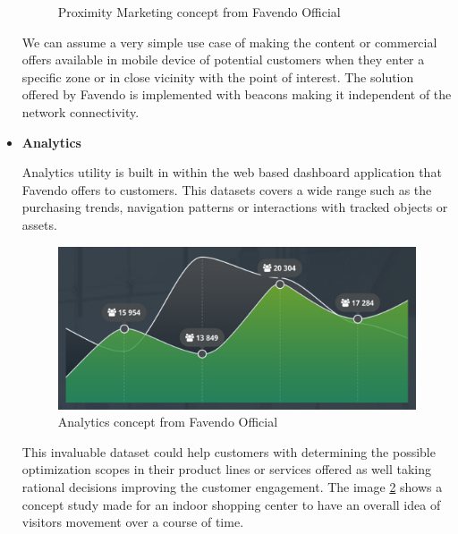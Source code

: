 \begin{itemize}
\begin{figure}[H]
	 	\caption{Proximity Marketing concept from Favendo Official \cite{favendoataglance}}
	 	\label{figure:proximitymarketing_concept}
	 \end{figure}
 	\par We can assume a very simple use case of making the content or commercial offers available in mobile device of potential customers when they enter a specific zone or in close vicinity with the point of interest. The solution offered by Favendo is implemented with beacons making it independent of the network connectivity.
 	\item \textbf{Analytics}
 	\par Analytics utility is built in within the web based dashboard application that Favendo offers to customers. This datasets covers a wide range such as the purchasing trends, navigation patterns or interactions with tracked objects or assets.
 	\begin{figure}[H]
 		\centering
 		\includegraphics[scale = 0.5]{images/analytics}
 		\caption{Analytics concept from Favendo Official \cite{favendoataglance}}
 		\label{figure:analytics_concept}
 	\end{figure}
 	\par This invaluable dataset could help customers with determining the possible optimization scopes in their product lines or services offered as well taking rational decisions improving the customer engagement. The image \ref{figure:analytics_concept} shows a concept study made for an indoor shopping center to have an overall idea of visitors movement over a course of time.
\end{itemize}



